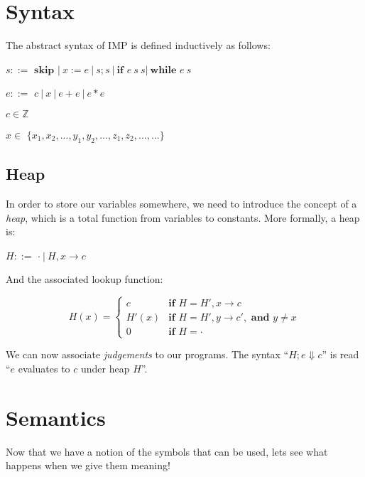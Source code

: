 \documentclass[11pt]{article}
\begin{document}
\section{Syntax}
The abstract syntax of IMP is defined inductively as follows:

\begin{description*}

\item[$s ::= $] $\textbf{skip } |\ x := e\ |\ s; s\ |\ \textbf{if } e\ s\ s |\ \textbf{while } e\ s$

\item[$e ::= $] $ c\ |\ x\ |\ e + e\ |\ e * e $

\item[$c \in \mathbb{Z}$]

\item[$x \in $] $\{ x_1, x_2, ..., y_1, y_2, ..., z_1, z_2, ..., ... \}$

\end{description*}

\subsection{Heap}
In order to store our variables somewhere, we need to introduce the concept of a \textit{heap}, which is a total function from variables to constants. More formally, a heap is:

\begin{description*}

\item[$H ::= $] $\cdot \ |\ H, x\to c$

\end{description*}

And the associated lookup function:

\[ 
H(x) = \begin{cases} 
      c & \textbf{if } H = H', x\to c \\
      H'(x) & \textbf{if } H = H', y\to c', \textbf{ and } y\neq x\\
      0 & \textbf{if } H = \cdot 
   \end{cases}
\]


We can now associate \textit{judgements} to our programs. The syntax ``$H; e \Downarrow c$'' is read ``$e$ evaluates to $c$ under heap $H$''.

\section{Semantics}
Now that we have a notion of the symbols that can be used, lets see what happens when we give them meaning!
\end{document}
